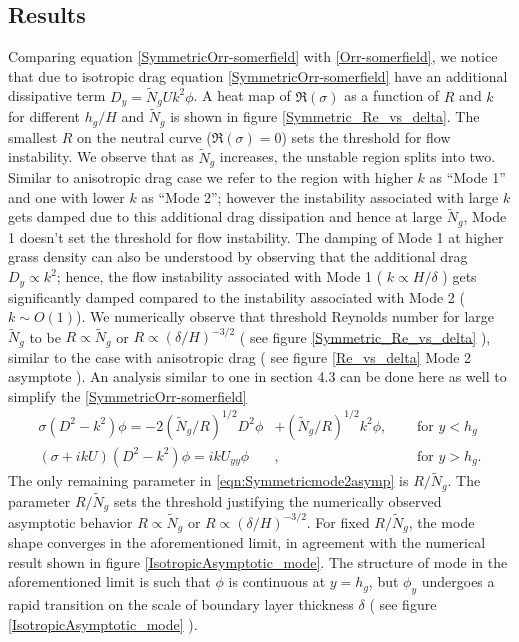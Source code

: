 \documentclass[12pt]{report}   %
\newcommand{\hg}{h_g}
\newcommand{\Rey}{{R}}
\newcommand{\Ndg}{\tilde{N}_g}
\begin{document}
\subsection{Results}
Comparing equation \eqref{SymmetricOrr-somerfield} with \eqref{Orr-somerfield}, we notice that due to isotropic drag equation \eqref{SymmetricOrr-somerfield} have an additional dissipative term $ D_y = \Ndg U k^2 \phi$. %
A heat map of $\Re (\sigma)$ as a function of $R$ and $k$ for different $h_g/H$ and $\Ndg$ is shown in figure \ref{Symmetric_Re_vs_delta}. The smallest $R$ on the neutral curve 
($\Re (\sigma)=0$) sets the threshold for flow instability. We observe that as $\Ndg$ increases, the unstable region splits into two. Similar to anisotropic drag case we refer to the region with higher $k$ as ``Mode 1'' and one with lower $k$ as ``Mode 2''; however the instability associated with large $k$ gets damped due to this additional drag dissipation and hence at large $\Ndg$, Mode 1 doesn't set the threshold for flow instability. The damping of Mode 1 at higher grass density can also be understood by observing that the additional drag $D_y \propto k^2$; hence, the flow instability associated with Mode 1 ( $k\propto H/\delta$ ) gets significantly damped compared to the instability associated with Mode 2 ($k\sim O(1)$). We numerically observe that threshold Reynolds number for large $\Ndg$ to be $ R \propto \Ndg$  or $R \propto (\delta/H)^{-3/2}$ ( see figure \ref{Symmetric_Re_vs_delta} ), similar to the case with anisotropic drag ( see figure \ref{Re_vs_delta} Mode 2 asymptote ). An analysis similar 
to one in section 4.3 can be done here as well to simplify the \ref{SymmetricOrr-somerfield}
\begin{subequations}
\begin{align}
\sigma\left( D^2-k^2\right)\phi = -2{(\Ndg/\Rey)^{1/2}}D^2\phi &+ (\Ndg/R)^{1/2} k^2 \phi,  \quad &\text{ for } y<\hg  \label{eqn:Symmetricmode2asympa} \\
\left(\sigma+ikU\right) \left(D^2-k^2\right)\phi =  ikU_{yy}\phi &, \quad &\text{ for } y>\hg. \label{eqn:Symmetricmode2asympb}
\end{align}
\label{eqn:Symmetricmode2asymp}
\end{subequations}
The only remaining parameter in \eqref{eqn:Symmetricmode2asymp} is $\Rey/\Ndg$. The parameter $\Rey/\Ndg$ sets the threshold justifying the numerically observed asymptotic behavior $\Rey \propto \Ndg $ or $ \Rey \propto (\delta/H)^{-3/2}$. For fixed $\Rey/\Ndg$, the mode shape converges in the aforementioned limit, in agreement with the numerical result shown in figure \ref{IsotropicAsymptotic_mode}. The structure of mode in the aforementioned limit is such that $\phi$ is continuous at $y=h_g$, but $\phi_y$ undergoes a rapid transition on the scale of boundary layer thickness $\delta$ 
( see figure \ref{IsotropicAsymptotic_mode} ).
\end{document}
